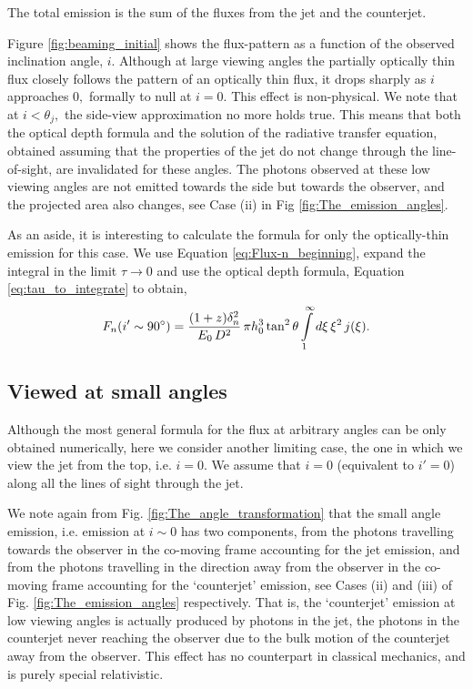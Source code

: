 The total emission is the sum of the fluxes from the jet and the counterjet.

Figure \ref{fig:beaming_initial} shows the flux-pattern as a function of the observed inclination angle, $i.$ Although at large viewing angles the partially optically thin flux closely follows the pattern of an optically thin flux, it drops sharply as $ i $ approaches $ 0 , $ formally to null at $ i = 0. $ This effect is non-physical. We note that at $ i < \theta_j , $ the side-view approximation no more holds true. This means that both the optical depth formula and the solution of the radiative transfer equation, obtained assuming that the properties of the jet do not change through the line-of-sight, are invalidated for these angles. The photons observed at these low viewing angles are not emitted towards the side but towards the observer, and the projected area also changes, see Case (ii) in Fig \ref{fig:The_emission_angles}.

As an aside, it is interesting to calculate the formula for only the optically-thin emission for this case. We use Equation \ref{eq:Flux-n_beginning}, expand the integral in the limit $ \tau \to 0 $ and use the optical depth formula, Equation \ref{eq:tau_to_integrate} to obtain,
\begin{equation}
F_{n} (i' \sim 90^{\circ}) = \frac{ (1+z) \delta_n^2 }{ \ee\, D^2 } \, \pi h_0^{3} \tan^2 \theta \intop_{1}^{\infty} d \xi \, \xi^2 \, j(\xi) . \label{eq:F_thin_formula}
\end{equation}


\subsection{Viewed at small angles}

Although the most general formula for the flux at arbitrary angles can be only obtained numerically, here we consider another limiting case, the one in which we view the jet from the top, i.e. $ i = 0 . $ We assume that $ i = 0 $ (equivalent to $ i' = 0 $) along all the lines of sight through the jet.

We note again from Fig. \ref{fig:The_angle_transformation} that the small angle emission, i.e. emission at $ i \sim 0 $ has two components, from the photons travelling towards the observer in the co-moving frame accounting for the jet emission, and from the photons travelling in the direction away from the observer in the co-moving frame accounting for the `counterjet' emission, see Cases (ii) and (iii) of Fig. \ref{fig:The_emission_angles} respectively. That is, the `counterjet' emission at low viewing angles is actually produced by photons in the jet, the photons in the counterjet never reaching the observer due to the bulk motion of the counterjet away from the observer. This effect has no counterpart in classical mechanics, and is purely special relativistic.


